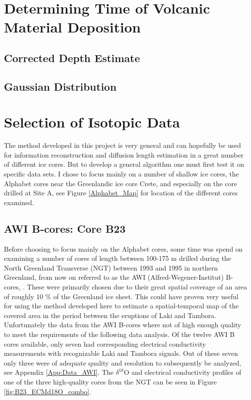 \documentclass[../../CompleteThesis2/Complete_2ndDraft]{subfiles}
\begin{document}
\section[Volcanic Horizons][Volcanic Horizons]{Determining Time of Volcanic Material Deposition}
\label{Sec:Data_VolcanicHorizons}

\subsection[Corrected Depth]{Corrected Depth Estimate}
\label{Subsec:Data_VolcanicHorizons_CorrDepthEst}

\subsection[Gaussian Distribution]{Gaussian Distribution}
\label{Subsec:Data_VolcanicHorizons_GaussDist}

\section[Selection][Selection]{Selection of Isotopic Data}
\label{Sec:Data_Selection}

The method developed in this project is very general and can hopefully be used for information reconstruction and diffusion length estimation in a great number of different ice cores. But to develop a general algorithm one must first test it on specific data sets. I chose to focus mainly on a number of shallow ice cores, the Alphabet cores near the Greenlandic ice core Crete, and especially on the core drilled at Site A, see Figure \ref{Alphabet_Map} for location of the different cores examined.

\subsection[AWI B-cores]{AWI B-cores: Core B23}
\label{Subsec:Data_Selection_Bcores}
Before choosing to focus mainly on the Alphabet cores, some time was spend on examining a number of cores of length between 100-175 m drilled during the North Greenland Transverse (NGT) between 1993 and 1995 in northern Greenland, from now on referred to as the AWI (Alfred-Wegener-Institut) B-cores, \cite[Weissbach et al. 2016]{Weissbach2016}. These were primarily chosen due to their great spatial coverage of an area of roughly 10 \% of the Greenland ice sheet. This could have proven very useful for using the method developed here to estimate a spatial-temporal map of the covered area in the period between the eruptions of Laki and Tambora. Unfortunately the data from the AWI B-cores where not of high enough quality to meet the requirements of the following data analysis. Of the twelve AWI B cores available, only seven had corresponding electrical conductivity measurements with recognizable Laki and Tambora signals. Out of these seven only three were of adequate quality and resolution to subsequently be analyzed, see Appendix \ref{App:Data_AWI}. The $\delta^{18}$O and electrical conductivity profiles of one of the three high-quality cores from the NGT can be seen in Figure \ref{fig:B23_ECMd18O_combo}.
\end{document}
